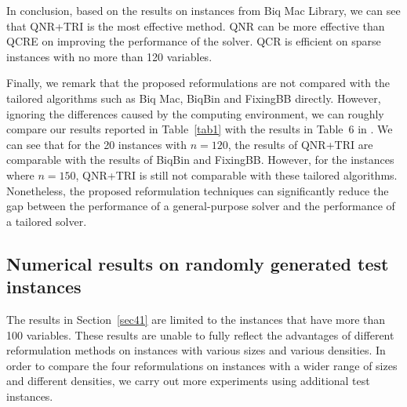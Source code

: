 \documentclass[pdflatex,sn-mathphys-num]{sn-jnl}%
\theoremstyle{thmstyleone}%
\theoremstyle{thmstyletwo}%
\theoremstyle{thmstylethree}%
\begin{document}
In conclusion, based on the results on instances from Biq Mac Library, we can see that QNR+TRI is the most effective method. QNR can be more effective than QCRE on improving the performance of the solver. QCR is efficient on sparse instances with no more than 120 variables.

Finally, we remark that the proposed reformulations are not compared with the tailored algorithms such as Biq Mac, BiqBin and FixingBB directly. However, ignoring the differences caused by the computing environment, we can roughly compare our results reported in Table~\ref{tab1} with the results in Table~6 in \cite{Locatelli2024}. We can see that for the 20 instances with $n=120$, the results of QNR+TRI are comparable with the results of BiqBin and FixingBB. However, for the instances where $n=150$, QNR+TRI is still not comparable with these tailored algorithms. Nonetheless, the proposed reformulation techniques can significantly reduce the gap between the performance of a general-purpose solver and the performance of a tailored solver.

\subsection{Numerical results on randomly generated test instances}\label{sec42}

The results in Section~\ref{sec41} are limited to the instances that have more than 100 variables. These results are unable to fully reflect the advantages of different reformulation methods on instances with various sizes and various densities. In order to compare the four reformulations on instances with a wider range of sizes and different densities, we carry out more experiments using additional test instances.
\end{document}
